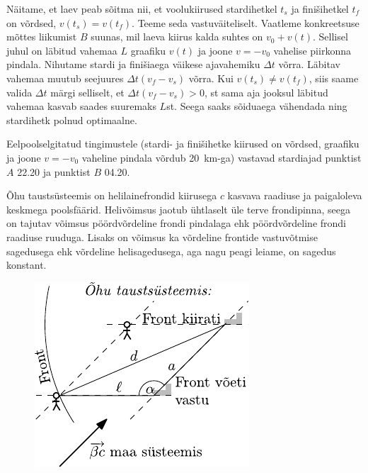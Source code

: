 \documentclass[10pt]{article}
\begin{document}
{
\solu
Näitame, et laev peab sõitma nii, et voolukiirused stardihetkel $t_s$ ja finišihetkel $t_f$ on võrdsed, $v(t_s) = v(t_f)$. Teeme seda vastuväiteliselt. Vaatleme konkreetsuse mõttes liikumist $B$ suunas, mil laeva kiirus kalda suhtes on $v_0 + v(t)$. Sellisel juhul on läbitud vahemaa $L$ graafiku $v(t)$ ja joone $v = -v_0$ vahelise piirkonna pindala. Nihutame stardi ja finišiaega väikese ajavahemiku $\Delta t$ võrra. Läbitav vahemaa muutub seejuures $\Delta t(v_f - v_s)$ võrra. Kui $v(t_s) \neq v(t_f)$, siis saame valida $\Delta t$ märgi selliselt, et $\Delta t(v_f - v_s) > 0$, st sama aja jooksul läbitud vahemaa kasvab saades suuremaks $L$st. Seega saaks sõiduaega vähendada ning stardihetk polnud optimaalne.

Eelpoolselgitatud tingimustele (stardi- ja finišihetke kiirused on võrdsed, graafiku ja joone $v = -v_0$ vaheline pindala võrdub \SI{20}{km}-ga) vastavad stardiajad punktist $A$ 22.20 ja punktist $B$ 04.20.
\probend
\bigskip


\solu
Õhu taustsüsteemis on helilainefrondid kiirusega $c$ kasvava raadiuse ja paigaloleva keskmega poolsfäärid. Helivõimsus jaotub ühtlaselt üle terve frondipinna, seega on tajutav võimsus pöördvõrdeline frondi pindalaga ehk pöördvõrdeline frondi raadiuse ruuduga. Lisaks on võimsus ka võrdeline frontide vastuvõtmise sagedusega ehk võrdeline helisagedusega, aga nagu peagi leiame, on sagedus konstant.

\begin{figure}
	\vspace{-10pt}
	\begin{center}
		\includegraphics[width = 0.9\linewidth]{2009-lahg-10-lah}
	\end{center}
\end{figure}

}
\end{document}
